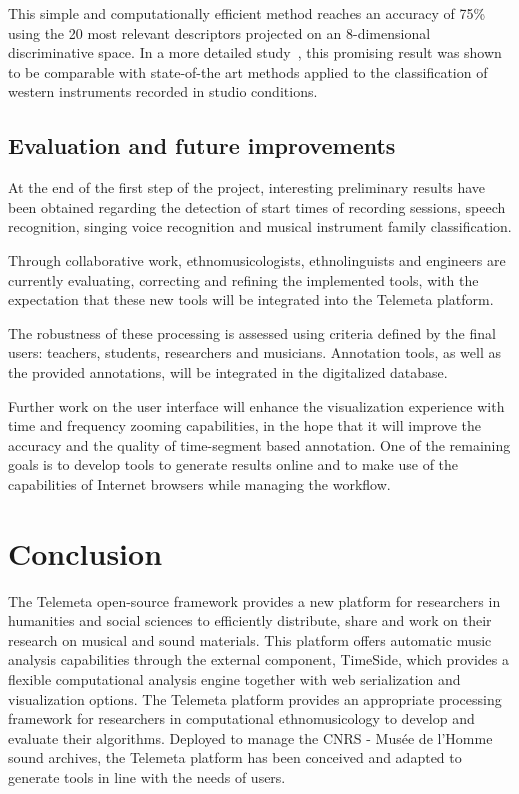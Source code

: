 \documentclass{sig-alternate}
\begin{document}
This simple and computationally efficient method reaches an accuracy of 75\% 
using the 20 most relevant descriptors projected on an 8-dimensional discriminative space. In a more detailed study~\cite{ismir14_dfourer},
this promising result was shown to be comparable with state-of-the art methods applied to the classification of western instruments recorded in studio conditions.



\subsection{Evaluation and future improvements}

At the end of the first step of the project, interesting preliminary results have been obtained regarding the detection of start times of recording sessions, speech recognition, singing voice recognition and musical instrument family classification.

Through collaborative work, ethnomusicologists, ethnolinguists and engineers are currently evaluating, correcting and refining the implemented tools, with the expectation that these new tools will be integrated into the Telemeta platform. 

The robustness of these processing is assessed using criteria defined by the final users: teachers, students, researchers and musicians. Annotation tools, as well as the provided annotations, will be integrated in the digitalized database. 

Further work on the user interface will enhance the visualization experience with time and frequency zooming capabilities, in the hope that it will improve the accuracy and the quality of time-segment based annotation. One of the remaining goals is to develop tools to generate results online and to make use of the capabilities of Internet browsers while managing the workflow. 


\section{Conclusion}
 The Telemeta open-source framework provides a new platform for researchers in humanities and social sciences to efficiently distribute, share and work on their research on musical and sound materials. 
This platform offers automatic music analysis capabilities through the external component, TimeSide, which provides a flexible computational analysis engine together with web serialization and visualization options. 
The Telemeta platform provides an appropriate processing framework for researchers in computational ethnomusicology to develop and evaluate their algorithms. 
Deployed to manage the CNRS - Musée de l’Homme sound archives, the Telemeta platform has been conceived and adapted to generate tools in line with the needs of users. 
\end{document}
